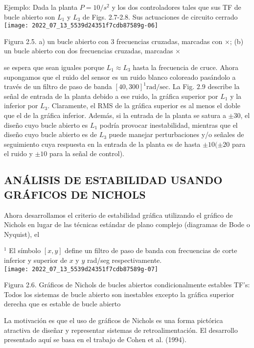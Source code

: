 Ejemplo: Dada la planta $P=10 / s^{2}$ y los dos controladores tales que sus TF de bucle abierto son $L_{1}$ y $L_{3}$ de Figs. 2.7-2.8. Sus actuaciones de circuito cerrado\\

\texttt{[image: 2022\_07\_13\_5539d24351f7cdb87589g-06]}

Figura 2.5. a) un bucle abierto con 3 frecuencias cruzadas, marcadas con $\times$; (b) un bucle abierto con dos frecuencias cruzadas, marcadas $\times$

se espera que sean iguales porque $L_{1} \approx  L_{3}$ hasta la frecuencia de cruce. Ahora supongamos que el ruido del sensor es un ruido blanco coloreado pasándolo a través de un filtro de paso de banda $[40,300]^{1} \mathrm{rad} / \mathrm{sec}$. La Fig. $2.9$ describe la señal de entrada de la planta debido a ese ruido, la gráfica superior por $L_{1}$ y la inferior por $L_{3}$. Claramente, el RMS de la gráfica superior es al menos el doble que el de la gráfica inferior. Además, si la entrada de la planta se satura a $\pm 30$, el diseño cuyo bucle abierto es $L_{1}$ podría provocar inestabilidad, mientras que el diseño cuyo bucle abierto es de $L_{3}$ puede manejar perturbaciones y/o señales de seguimiento cuya respuesta en la entrada de la planta es de hasta $\pm 10(\pm 20$ para el ruido y $\pm 10$ para la señal de control).

\subsection{ANÁLISIS DE ESTABILIDAD USANDO GRÁFICOS DE NICHOLS}
Ahora desarrollamos el criterio de estabilidad gráfica utilizando el gráfico de Nichols en lugar de las técnicas estándar de plano complejo (diagramas de Bode o Nyquist), el

${ }^{1}$ El símbolo $[x, y]$ define un filtro de paso de banda con frecuencias de corte inferior y superior de $x$ y $y$ rad/seg respectivamente.\\

\texttt{[image: 2022\_07\_13\_5539d24351f7cdb87589g-07]}

Figura 2.6. Gráficos de Nichols de bucles abiertos condicionalmente estables TF's: Todos los sistemas de bucle abierto son inestables excepto la gráfica superior derecha que es estable de bucle abierto

La motivación es que el uso de gráficos de Nichols es una forma pictórica atractiva de diseñar y representar sistemas de retroalimentación. El desarrollo presentado aquí se basa en el trabajo de Cohen et al. (1994).


